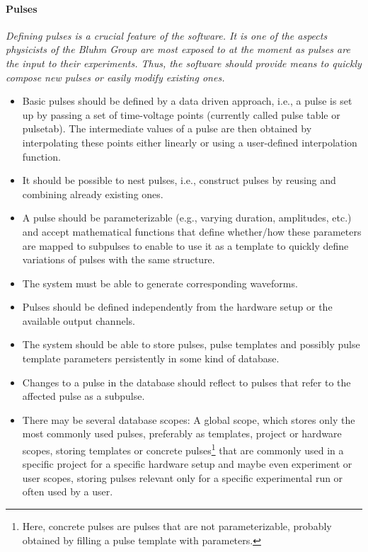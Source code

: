 \documentclass[a4paper,12pt]{article}
\begin{document}
\paragraph{Pulses}
\textit{Defining pulses is a crucial feature of the software. It is one of the aspects physicists of the Bluhm Group are most exposed to at the moment as pulses are the input to their experiments. Thus, the software should provide means to quickly compose new pulses or easily modify existing ones.}
\begin{itemize} \itemsep-0.5pt
 \item Basic pulses should be defined by a data driven approach, i.e., a pulse is set up by passing a set of time-voltage points (currently called pulse table or pulsetab). The intermediate values of a pulse are then obtained by interpolating these points either linearly or using a user-defined interpolation function.
 \item It should be possible to nest pulses, i.e., construct pulses by reusing and combining already existing ones.
 \item A pulse should be parameterizable (e.g., varying duration, amplitudes, etc.) and accept mathematical functions that define whether/how these parameters are mapped to subpulses to enable to use it as a template to quickly define variations of pulses with the same structure.
 \item The system must be able to generate corresponding waveforms.
 \item Pulses should be defined independently from the hardware setup or the available output channels.
 \item The system should be able to store pulses, pulse templates and possibly pulse template parameters persistently in some kind of database.
 \item Changes to a pulse in the database should reflect to pulses that refer to the affected pulse as a subpulse.
 \item There may be several database scopes: A global scope, which stores only the most commonly used pulses, preferably as templates, project or hardware scopes, storing templates or concrete pulses\footnote{Here, concrete pulses are pulses that are not parameterizable, probably obtained by filling a pulse template with parameters.} that are commonly used in a specific project for a specific hardware setup and maybe even experiment or user scopes, storing pulses relevant only for a specific experimental run or often used by a user.
\end{itemize}
\end{document}
